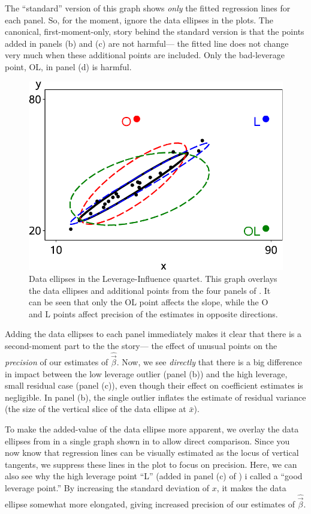 The ``standard'' version of this graph shows \emph{only} the fitted regression lines for each
panel. So, for the moment, ignore the data ellipses in the plots.
The canonical, first-moment-only, story behind the standard version is that the points added in panels
(b) and (c) are not harmful--- the fitted line does not change very much when these
additional points are included. Only the bad-leverage point, OL, in panel (d) is harmful.

\begin{figure}[htb!]
  \centering
  \includegraphics[width=.8\textwidth,clip]{fig/levdemo22}
  \caption{Data ellipses in the Leverage-Influence quartet. This graph overlays the data ellipses
  and additional points from the four panels of . It can be seen that only the
  OL point affects the slope, while the O and L points affect precision of the estimates in opposite
  directions.}%
  \label{fig:levdemo22}
\end{figure}

Adding the data ellipses to each panel immediately makes it clear that there is a second-moment
part to the the story--- the effect of unusual points on the \emph{precision} of our estimates
of $\hat{\vec{\beta}}$.  Now, 
we see \emph{directly} that there is a big difference in impact between 
the low leverage outlier (panel (b)) and the high leverage, small residual case (panel (c)),
even though their effect on coefficient estimates is negligible.
In panel (b), the single outlier inflates the estimate of residual variance (the size of the
vertical slice of the data ellipse at $\bar{x}$).

To make the added-value of the data ellipse more apparent, we overlay the data ellipses from
 in a single graph shown in 
 to allow direct comparison.  Since you now know that regression lines
can be visually estimated as the locus of vertical tangents, we suppress these lines in the
plot to focus on precision.  Here, we can also see why the high leverage 
point ``L'' (added in panel (c) of ) i called a ``good leverage point.''
By increasing the standard deviation of $x$, it makes the data ellipse somewhat more elongated,
giving increased precision of our estimates of $\hat{\vec{\beta}}$.

